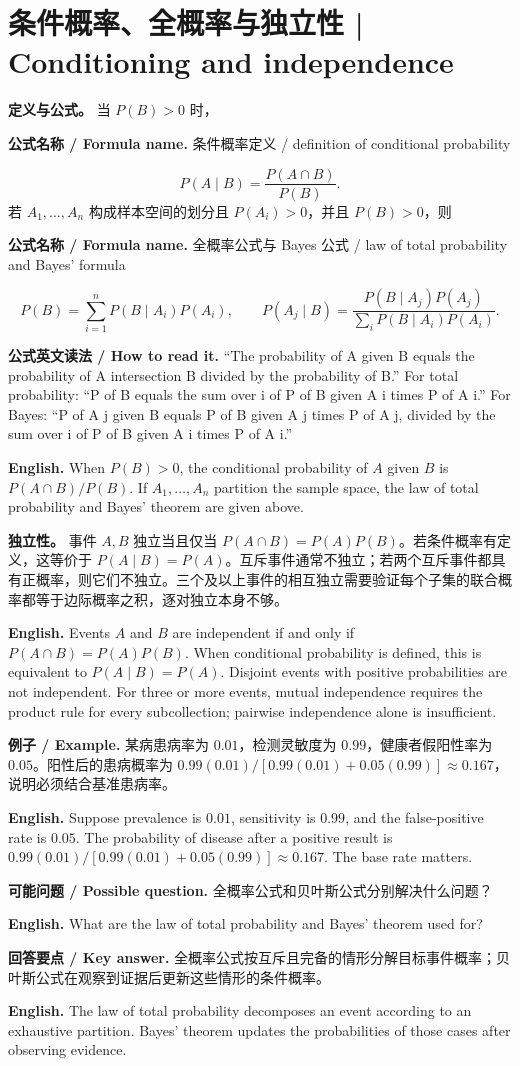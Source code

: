 \documentclass[UTF8,11pt,a4paper]{ctexart}
\newcommand{\EN}[1]{\par\noindent\textbf{English.} #1\par}
\newcommand{\READ}[1]{\par\noindent\textbf{公式英文读法 / How to read it.} #1\par}
\newcommand{\FORMULA}[2]{\par\noindent\textbf{公式名称 / Formula name.} #1 / #2\par}
\newcommand{\EX}[2]{\par\noindent\textbf{例子 / Example.} #1\par\EN{#2}}
\newcommand{\ASK}[4]{\par\noindent\textbf{可能问题 / Possible question.} #1\par\EN{#2}\noindent\textbf{回答要点 / Key answer.} #3\par\EN{#4}\medskip}
\begin{document}
\section{条件概率、全概率与独立性 | Conditioning and independence}
\noindent\textbf{定义与公式。} 当 $P(B)>0$ 时，
\FORMULA{条件概率定义}{definition of conditional probability}
\[
P(A\mid B)=\frac{P(A\cap B)}{P(B)}.
\]
若 $A_1,\ldots,A_n$ 构成样本空间的划分且 $P(A_i)>0$，并且 $P(B)>0$，则
\FORMULA{全概率公式与 Bayes 公式}{law of total probability and Bayes' formula}
\[
P(B)=\sum_{i=1}^nP(B\mid A_i)P(A_i),\qquad
P(A_j\mid B)=\frac{P(B\mid A_j)P(A_j)}{\sum_iP(B\mid A_i)P(A_i)}.
\]
\READ{“The probability of A given B equals the probability of A intersection B divided by the probability of B.” For total probability: “P of B equals the sum over i of P of B given A i times P of A i.” For Bayes: “P of A j given B equals P of B given A j times P of A j, divided by the sum over i of P of B given A i times P of A i.”}
\EN{When $P(B)>0$, the conditional probability of $A$ given $B$ is $P(A\cap B)/P(B)$. If $A_1,\ldots,A_n$ partition the sample space, the law of total probability and Bayes' theorem are given above.}

\noindent\textbf{独立性。} 事件 $A,B$ 独立当且仅当 $P(A\cap B)=P(A)P(B)$。若条件概率有定义，这等价于 $P(A\mid B)=P(A)$。互斥事件通常不独立；若两个互斥事件都具有正概率，则它们不独立。三个及以上事件的相互独立需要验证每个子集的联合概率都等于边际概率之积，逐对独立本身不够。

\EN{Events $A$ and $B$ are independent if and only if $P(A\cap B)=P(A)P(B)$. When conditional probability is defined, this is equivalent to $P(A\mid B)=P(A)$. Disjoint events with positive probabilities are not independent. For three or more events, mutual independence requires the product rule for every subcollection; pairwise independence alone is insufficient.}

\EX{某病患病率为 $0.01$，检测灵敏度为 $0.99$，健康者假阳性率为 $0.05$。阳性后的患病概率为 $0.99(0.01)/[0.99(0.01)+0.05(0.99)]\approx0.167$，说明必须结合基准患病率。}{Suppose prevalence is $0.01$, sensitivity is $0.99$, and the false-positive rate is $0.05$. The probability of disease after a positive result is $0.99(0.01)/[0.99(0.01)+0.05(0.99)]\approx0.167$. The base rate matters.}

\ASK{全概率公式和贝叶斯公式分别解决什么问题？}{What are the law of total probability and Bayes' theorem used for?}{全概率公式按互斥且完备的情形分解目标事件概率；贝叶斯公式在观察到证据后更新这些情形的条件概率。}{The law of total probability decomposes an event according to an exhaustive partition. Bayes' theorem updates the probabilities of those cases after observing evidence.}
\end{document}
